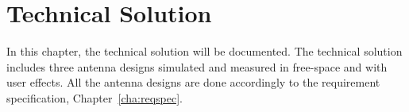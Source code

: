 \chapter{Technical Solution}
In this chapter, the technical solution will be documented. The technical solution includes three antenna designs simulated and measured in free-space and with user effects. All the antenna designs are done accordingly to the requirement specification, Chapter~\ref{cha:reqspec}. 
